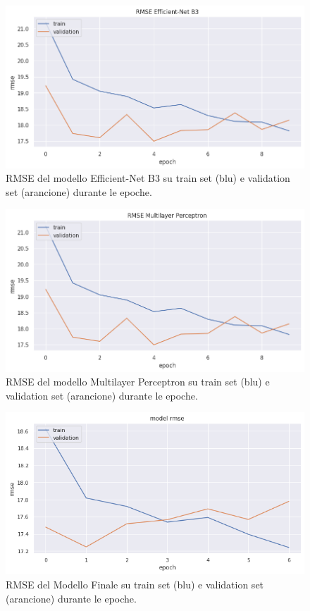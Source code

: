     \begin{figure}[h]
        \centering
        \includegraphics[scale=0.6]{Plot/CNN_RMSE.png}
        \caption{RMSE del modello Efficient-Net B3 su train set (blu) e validation set (arancione) durante le epoche.}
        \label{fig:rmse-cnn}
    \end{figure}

\newpage


    \begin{figure}[h]
        \centering
        \vspace*{-2.5cm}
        \includegraphics[scale=0.55]{Plot/MLP_RMSE.png}
        \caption{RMSE del modello Multilayer Perceptron su train set (blu) e validation set (arancione) durante le epoche.}
        \label{fig:rmse-mlp}
    \end{figure}
    

    \begin{figure}[h]
        \centering
        \includegraphics[scale=0.55]{Plot/FINAL_RMSE.png}
        \caption{RMSE del Modello Finale su train set (blu) e validation set (arancione) durante le epoche.}
        \label{fig:rmse-final}
    \end{figure}
    
